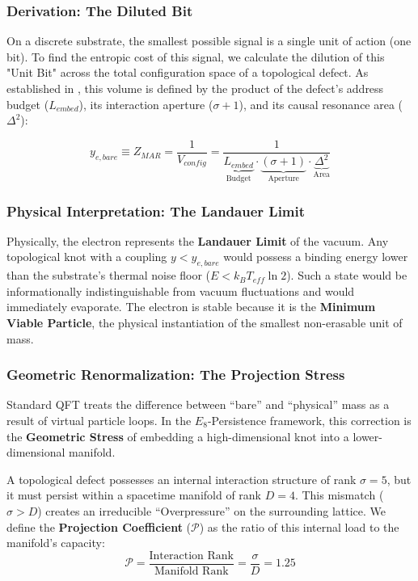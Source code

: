 \subsubsection{Derivation: The Diluted Bit}
On a discrete substrate, the smallest possible signal is a single unit of action (one bit). To find the entropic cost of this signal, we calculate the dilution of this "Unit Bit" across the total configuration space of a topological defect. As established in \cite{meyer_informational_2026}, this volume is defined by the product of the defect's address budget ($L_{embed}$), its interaction aperture ($\sigma+1$), and its causal resonance area ($\Delta^2$):

\begin{equation}
y_{e,bare} \equiv Z_{MAR} = \frac{1}{V_{config}} = \frac{1}{\underbrace{L_{embed}}_{\text{Budget}} \cdot \underbrace{(\sigma+1)}_{\text{Aperture}} \cdot \underbrace{\Delta^2}_{\text{Area}}}
\end{equation}

\subsubsection{Physical Interpretation: The Landauer Limit}
Physically, the electron represents the \textbf{Landauer Limit} of the vacuum. Any topological knot with a coupling $y < y_{e,bare}$ would possess a binding energy lower than the substrate's thermal noise floor ($E < k_B T_{eff} \ln 2$). Such a state would be informationally indistinguishable from vacuum fluctuations and would immediately evaporate. The electron is stable because it is the \textbf{Minimum Viable Particle}, the physical instantiation of the smallest non-erasable unit of mass.

\subsubsection{Geometric Renormalization: The Projection Stress}
Standard QFT treats the difference between ``bare'' and ``physical'' mass as a result of virtual particle loops. In the $E_8$-Persistence framework, this correction is the \textbf{Geometric Stress} of embedding a high-dimensional knot into a lower-dimensional manifold.

A topological defect possesses an internal interaction structure of rank $\sigma=5$, but it must persist within a spacetime manifold of rank $D=4$. This mismatch ($\sigma > D$) creates an irreducible ``Overpressure'' on the surrounding lattice. We define the \textbf{Projection Coefficient} ($\mathcal{P}$) as the ratio of this internal load to the manifold's capacity:
\begin{equation}
\mathcal{P} = \frac{\text{Interaction Rank}}{\text{Manifold Rank}} = \frac{\sigma}{D} = 1.25
\end{equation}

